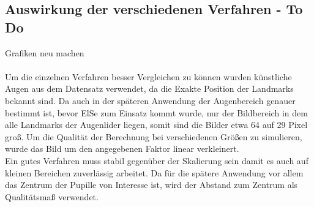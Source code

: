 \subsection{Auswirkung der verschiedenen Verfahren - To Do}
Grafiken neu machen\\\\
Um die einzelnen Verfahren besser Vergleichen zu können wurden künstliche Augen aus dem Datensatz \cite{database_Eye} verwendet, da die Exakte Position der Landmarks bekannt sind.
Da auch in der späteren Anwendung der Augenbereich genauer bestimmt ist, bevor ElSe zum Einsatz kommt wurde, nur der Bildbereich in dem alle Landmarks der Augenlider liegen, somit sind die Bilder etwa 64 auf 29 Pixel groß. Um die Qualität der Berechnung bei verschiedenen Größen zu simulieren, wurde das Bild um den angegebenen Faktor linear verkleinert.\\
Ein gutes Verfahren muss stabil gegenüber der Skalierung sein damit es auch auf kleinen Bereichen zuverlässig arbeitet. Da für die spätere Anwendung vor allem das Zentrum der Pupille von Interesse ist, wird der Abstand zum Zentrum als Qualitätsmaß verwendet.\\
